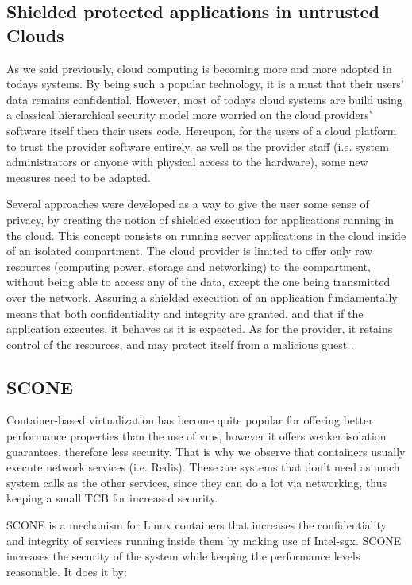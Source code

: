 \subsection{Shielded protected applications in untrusted Clouds}
\label{ssec:shieldedApps}

As we said previously, cloud computing is becoming more and more adopted in todays systems. 
By being such a popular technology, it is a must that their users' data remains confidential. 
However, most of todays cloud systems are build using a classical hierarchical security model more worried on the cloud providers' software itself then their users code. 
Hereupon, for the users of a cloud platform to trust the provider software entirely, as well as the provider staff (i.e. system administrators or anyone with physical access to the hardware), some new measures need to be adapted.

Several approaches were developed as a way to give the user some sense of privacy, by creating the notion of shielded execution for applications running in the cloud. 
This concept consists on running server applications in the cloud inside of an isolated compartment. The cloud provider is limited to offer only raw resources (computing power, storage and networking) to the compartment, without being able to access any of the  data, except the one being transmitted over the network. 
Assuring a shielded execution of an application fundamentally means that both confidentiality and integrity are granted, and that if the application executes, it behaves as it is expected. As for the provider, it retains control of the resources, and may protect itself from a malicious guest \cite{havenPaper}. 


\subsection{SCONE}
\label{ssec:scone}

Container-based virtualization has become quite popular for offering better performance properties than the use of \gls{vm}s, however it offers weaker isolation guarantees, therefore less security. 
That is why we observe that containers usually execute network services (i.e. Redis). These are systems that don't need as much system calls as the other services, since they can do a lot via networking, thus keeping a small TCB for increased security.

SCONE \cite{sconePaper} is a mechanism for Linux containers that increases the confidentiality and integrity of services running inside them by making use of Intel-\gls{sgx}.
SCONE increases the security of the system while keeping the performance levels reasonable. 
It does it by: 

